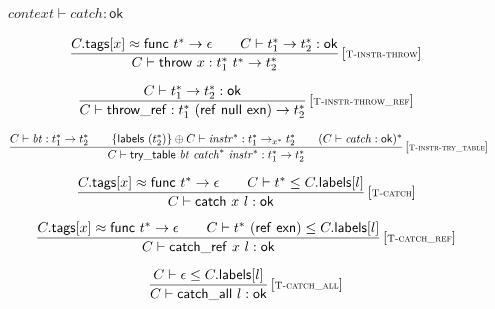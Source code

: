 \vspace{1ex}

$\boxed{{\mathit{context}} \vdash {\mathit{catch}} : \mathsf{ok}}$

$$
\begin{array}{@{}c@{}}\displaystyle
\frac{
C{.}\mathsf{tags}{}[x] \approx \mathsf{func}~{t^\ast} \rightarrow \epsilon
 \qquad
C \vdash {t_1^\ast} \rightarrow {t_2^\ast} : \mathsf{ok}
}{
C \vdash \mathsf{throw}~x : {t_1^\ast}~{t^\ast} \rightarrow {t_2^\ast}
} \, {[\textsc{\scriptsize T{-}instr{-}throw}]}
\qquad
\end{array}
$$

$$
\begin{array}{@{}c@{}}\displaystyle
\frac{
C \vdash {t_1^\ast} \rightarrow {t_2^\ast} : \mathsf{ok}
}{
C \vdash \mathsf{throw\_ref} : {t_1^\ast}~(\mathsf{ref}~\mathsf{null}~\mathsf{exn}) \rightarrow {t_2^\ast}
} \, {[\textsc{\scriptsize T{-}instr{-}throw\_ref}]}
\qquad
\end{array}
$$

$$
\begin{array}{@{}c@{}}\displaystyle
\frac{
C \vdash {\mathit{bt}} : {t_1^\ast} \rightarrow {t_2^\ast}
 \qquad
\{ \mathsf{labels}~({t_2^\ast}) \} \oplus C \vdash {{\mathit{instr}}^\ast} : {t_1^\ast} \rightarrow_{{x^\ast}} {t_2^\ast}
 \qquad
(C \vdash {\mathit{catch}} : \mathsf{ok})^\ast
}{
C \vdash \mathsf{try\_table}~{\mathit{bt}}~{{\mathit{catch}}^\ast}~{{\mathit{instr}}^\ast} : {t_1^\ast} \rightarrow {t_2^\ast}
} \, {[\textsc{\scriptsize T{-}instr{-}try\_table}]}
\qquad
\end{array}
$$

$$
\begin{array}{@{}c@{}}\displaystyle
\frac{
C{.}\mathsf{tags}{}[x] \approx \mathsf{func}~{t^\ast} \rightarrow \epsilon
 \qquad
C \vdash {t^\ast} \leq C{.}\mathsf{labels}{}[l]
}{
C \vdash \mathsf{catch}~x~l : \mathsf{ok}
} \, {[\textsc{\scriptsize T{-}catch}]}
\qquad
\end{array}
$$

$$
\begin{array}{@{}c@{}}\displaystyle
\frac{
C{.}\mathsf{tags}{}[x] \approx \mathsf{func}~{t^\ast} \rightarrow \epsilon
 \qquad
C \vdash {t^\ast}~(\mathsf{ref}~\mathsf{exn}) \leq C{.}\mathsf{labels}{}[l]
}{
C \vdash \mathsf{catch\_ref}~x~l : \mathsf{ok}
} \, {[\textsc{\scriptsize T{-}catch\_ref}]}
\qquad
\end{array}
$$

$$
\begin{array}{@{}c@{}}\displaystyle
\frac{
C \vdash \epsilon \leq C{.}\mathsf{labels}{}[l]
}{
C \vdash \mathsf{catch\_all}~l : \mathsf{ok}
} \, {[\textsc{\scriptsize T{-}catch\_all}]}
\qquad
\end{array}
$$

